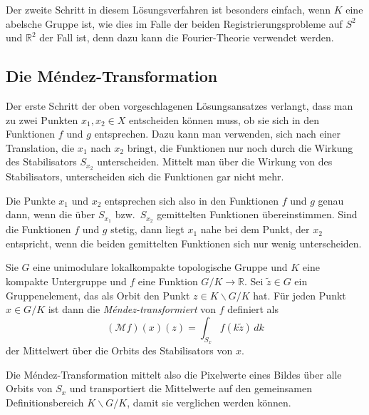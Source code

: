 Der zweite Schritt in diesem Lösungsverfahren ist besonders einfach,
wenn $K$ eine abelsche Gruppe ist, wie dies im Falle der beiden
Registrierungsprobleme auf $S^2$ und $\mathbb{R}^2$ der Fall ist,
denn dazu kann die Fourier-Theorie verwendet werden.

%
%
\subsection{Die Méndez-Transformation}
Der erste Schritt der oben vorgeschlagenen Lösungsansatzes verlangt,
dass man zu zwei Punkten $x_1,x_2\in X$ entscheiden können muss,
ob sie sich in den Funktionen $f$ und $g$ entsprechen.
Dazu kann man verwenden, sich nach einer Translation, die $x_1$ nach $x_2$
bringt, die Funktionen nur noch durch die Wirkung des Stabilisators
$S_{x_2}$ unterscheiden.
Mittelt man über die Wirkung von des Stabilisators, unterscheiden
sich die Funktionen gar nicht mehr.

Die Punkte $x_1$ und $x_2$ entsprechen sich also in den Funktionen $f$
und $g$ genau dann, wenn die über $S_{x_1}$ bzw.~$S_{x_2}$
gemittelten Funktionen übereinstimmen.
Sind die Funktionen $f$ und $g$ stetig, dann liegt $x_1$ nahe bei
dem Punkt, der $x_2$ entspricht, wenn die beiden gemittelten Funktionen
sich nur wenig unterscheiden.

\begin{definition}
Sie $G$ eine unimodulare lokalkompakte topologische Gruppe und $K$
eine kompakte Untergruppe und $f$ eine Funktion $G/K\to \mathbb{R}$.
Sei $\tilde{z}\in G$ ein Gruppenelement, das als Orbit
den Punkt $z\in K\backslash G/K$ hat.
Für jeden Punkt $x\in G/K$ ist dann die {\em Méndez-transformiert}
von $f$ definiert als
\[
(\mathcal{M}f)(x)(z)
=
\int_{S_x} f(k\tilde{z})\,dk
\]
der Mittelwert über die Orbits des Stabilisators von $x$.
\end{definition}

Die Méndez-Transformation mittelt also die Pixelwerte eines Bildes
über alle Orbits von $S_x$ und transportiert die Mittelwerte auf
den gemeinsamen Definitionsbereich $K\backslash G/K$, damit sie
verglichen werden können.

